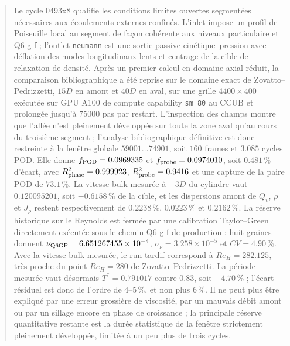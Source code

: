 \documentclass[11pt,a4paper]{article}
\begin{document}
\begin{abstract}
Le cycle 0493x8 qualifie les conditions limites ouvertes segmentées nécessaires aux écoulements externes confinés. L'inlet impose un profil de Poiseuille local au segment de façon cohérente aux niveaux particulaire et Q6-g-f ; l'outlet \texttt{neumann} est une sortie passive cinétique--pression avec déflation des modes longitudinaux lents et centrage de la cible de relaxation de densité. Après un premier calcul en domaine axial réduit, la comparaison bibliographique a été reprise sur le domaine exact de Zovatto--Pedrizzetti, $15D$ en amont et $40D$ en aval, sur une grille $4400\times400$ exécutée sur GPU A100 de compute capability \texttt{sm\_80} au CCUB et prolongée jusqu'à $75000$ pas par restart. L'inspection des champs montre que l'allée n'est pleinement développée sur toute la zone aval qu'au cours du troisième segment ; l'analyse bibliographique définitive est donc restreinte à la fenêtre globale $59001\ldots74901$, soit $160$ frames et $3.085$ cycles POD. Elle donne $f_{\rm POD}=0.0969335$ et $f_{\rm probe}=0.0974010$, soit $0.481\,\%$ d'écart, avec $R^2_{\rm phase}=0.999923$, $R^2_{\rm probe}=0.9416$ et une capture de la paire POD de $73.1\,\%$. La vitesse bulk mesurée à $-3D$ du cylindre vaut $0.120095201$, soit $-0.6158\,\%$ de la cible, et les dispersions amont de $Q_v$, $\bar\rho$ et $J_\rho$ restent respectivement de $0.2238\,\%$, $0.0223\,\%$ et $0.2162\,\%$. La réserve historique sur le Reynolds est fermée par une calibration Taylor--Green directement exécutée sous le chemin Q6-g-f de production : huit graines donnent $\nu_{\rm Q6GF}=6.651267455\times10^{-4}$, $\sigma_\nu=3.258\times10^{-5}$ et $CV=4.90\,\%$. Avec la vitesse bulk mesurée, le run tardif correspond à $Re_H=282.125$, très proche du point $Re_H=280$ de Zovatto--Pedrizzetti. La période mesurée vaut désormais $T^*=0.791017$ contre $0.83$, soit $-4.70\,\%$ ; l'écart résiduel est donc de l'ordre de $4$--$5\,\%$, et non plus $6\,\%$. Il ne peut plus être expliqué par une erreur grossière de viscosité, par un mauvais débit amont ou par un sillage encore en phase de croissance ; la principale réserve quantitative restante est la durée statistique de la fenêtre strictement pleinement développée, limitée à un peu plus de trois cycles.



\end{abstract}
\end{document}
